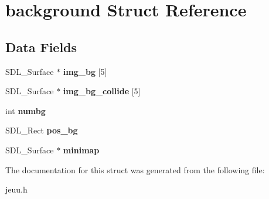 \hypertarget{structbackground}{}\section{background Struct Reference}
\label{structbackground}
\subsection*{Data Fields}
\begin{DoxyCompactItemize}
\item 
S\+D\+L\+\_\+\+Surface $\ast$ {\bfseries img\+\_\+bg} \mbox{[}5\mbox{]}\hypertarget{structbackground_a166a3fb00a62bc1b88009c27a5e64596}{}\label{structbackground_a166a3fb00a62bc1b88009c27a5e64596}

\item 
S\+D\+L\+\_\+\+Surface $\ast$ {\bfseries img\+\_\+bg\+\_\+collide} \mbox{[}5\mbox{]}\hypertarget{structbackground_af7e9aadc2062c6863df3524777b2b21f}{}\label{structbackground_af7e9aadc2062c6863df3524777b2b21f}

\item 
int {\bfseries numbg}\hypertarget{structbackground_afd37bd0886cccb314b4e7710b373c391}{}\label{structbackground_afd37bd0886cccb314b4e7710b373c391}

\item 
S\+D\+L\+\_\+\+Rect {\bfseries pos\+\_\+bg}\hypertarget{structbackground_a3d024aad23fb649b3d19f8311f3486e3}{}\label{structbackground_a3d024aad23fb649b3d19f8311f3486e3}

\item 
S\+D\+L\+\_\+\+Surface $\ast$ {\bfseries minimap}\hypertarget{structbackground_a812fef0b51d57a98aba7fabb2483c19a}{}\label{structbackground_a812fef0b51d57a98aba7fabb2483c19a}

\end{DoxyCompactItemize}


The documentation for this struct was generated from the following file\+:\begin{DoxyCompactItemize}
\item 
jeuu.\+h\end{DoxyCompactItemize}
